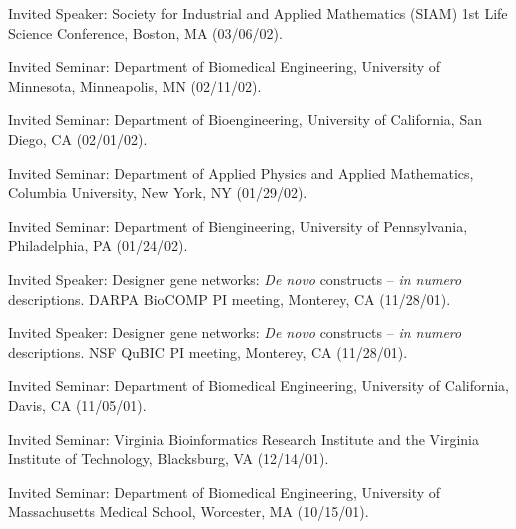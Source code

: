 \item Invited Speaker: Society for Industrial and Applied Mathematics (SIAM) 1st Life
Science Conference, Boston, MA (03/06/02).

\item Invited Seminar: Department of Biomedical Engineering,
University of Minnesota, Minneapolis, MN (02/11/02).

\item  Invited Seminar: Department of Bioengineering, University of
California, San Diego, CA (02/01/02).

\item  Invited Seminar: Department of Applied Physics and Applied
Mathematics, Columbia University, New York, NY (01/29/02).

\item Invited Seminar: Department of Biengineering, University of
Pennsylvania, Philadelphia, PA (01/24/02).

\item Invited Speaker: Designer gene networks: {\em De novo} constructs -- {\em in
numero} descriptions.  DARPA BioCOMP PI meeting, Monterey, CA
(11/28/01).

\item Invited Speaker: Designer gene networks: {\em De novo} constructs -- {\em in
numero} descriptions.  NSF QuBIC PI meeting, Monterey, CA
(11/28/01).

\item Invited Seminar: Department of Biomedical Engineering,
University of California, Davis, CA (11/05/01).

\item  Invited Seminar: Virginia Bioinformatics Research Institute
and the Virginia Institute of Technology, Blacksburg, VA
(12/14/01).

\item Invited Seminar: Department of Biomedical Engineering, University of Massachusetts
Medical School, Worcester, MA (10/15/01).

